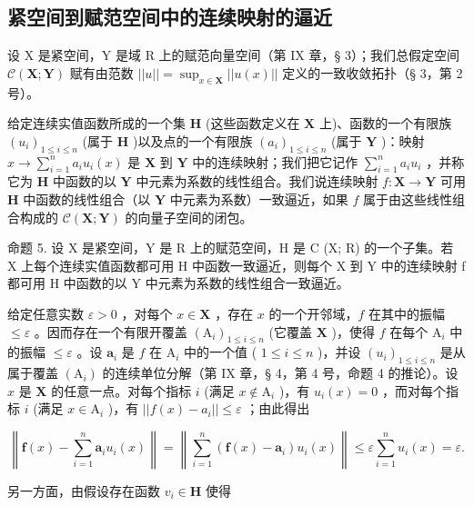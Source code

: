 \subsection{紧空间到赋范空间中的连续映射的逼近}

设 X 是紧空间，Y 是域 R 上的赋范向量空间（第 IX 章，§ 3）；我们总假定空间 \(\mathcal{C}(\mathbf{X};\mathbf{Y})\) 赋有由范数 \(||u|| = \sup_{x\in \mathbf{X}}||u(x)||\) 定义的一致收敛拓扑（§ 3，第 2 号）。

给定连续实值函数所成的一个集 \(\mathbf{H}\) (这些函数定义在 \(\mathbf{X}\) 上)、函数的一个有限族 \((u_i)_{1\leqslant i\leqslant n}\) (属于 \(\mathbf{H}\) )以及点的一个有限族 \((a_i)_{1\leqslant i\leqslant n}\) (属于 \(\mathbf{Y}\) )：映射 \(x\to \sum_{i = 1}^{n}a_iu_i(x)\) 是 \(\mathbf{X}\) 到 \(\mathbf{Y}\) 中的连续映射；我们把它记作 \(\sum_{i = 1}^{n}a_iu_i\) ，并称它为 \(\mathbf{H}\) 中函数的以 \(\mathbf{Y}\) 中元素为系数的线性组合。我们说连续映射 \(f:\mathbf{X}\rightarrow \mathbf{Y}\) 可用 \(\mathbf{H}\) 中函数的线性组合（以 \(\mathbf{Y}\) 中元素为系数）一致逼近，如果 \(f\) 属于由这些线性组合构成的 \(\mathcal{C}(\mathbf{X};\mathbf{Y})\) 的向量子空间的闭包。

命题 5. 设 X 是紧空间，Y 是 R 上的赋范空间，H 是 C (X; R) 的一个子集。若 X 上每个连续实值函数都可用 H 中函数一致逼近，则每个 X 到 Y 中的连续映射 f 都可用 H 中函数的以 Y 中元素为系数的线性组合一致逼近。

给定任意实数 \(\varepsilon > 0\) ，对每个 \(x \in \mathbf{X}\) ，存在 \(x\) 的一个开邻域，\(f\) 在其中的振幅 \(\leqslant \varepsilon\) 。因而存在一个有限开覆盖 \((\mathrm{A}_i)_{1 \leqslant i \leqslant n}\) (它覆盖 \(\mathbf{X}\) )，使得 \(f\) 在每个 \(\mathrm{A}_i\) 中的振幅 \(\leqslant \varepsilon\) 。设 \(\boldsymbol{a}_i\) 是 \(f\) 在 \(\mathrm{A}_i\) 中的一个值 ( \(1 \leqslant i \leqslant n\) )，并设 \((u_i)_{1 \leqslant i \leqslant n}\) 是从属于覆盖 \((\mathrm{A}_i)\) 的连续单位分解（第 IX 章，§ 4，第 4 号，命题 4 的推论）。设 \(x\) 是 \(\mathbf{X}\) 的任意一点。对每个指标 \(i\) (满足 \(x \notin \mathrm{A}_i\) )，有 \(u_i(x) = 0\) ，而对每个指标 \(i\) (满足 \(x \in \mathrm{A}_i\) )，有 \(||f(x) - a_i|| \leqslant \varepsilon\) ；由此得出

\[
\left\| \boldsymbol {f} (x) - \sum_ {i = 1} ^ {n} \boldsymbol {a} _ {i} u _ {i} (x) \right\| = \left\| \sum_ {i = 1} ^ {n} (\boldsymbol {f} (x) - \boldsymbol {a} _ {i}) u _ {i} (x) \right\| \leqslant \varepsilon \sum_ {i = 1} ^ {n} u _ {i} (x) = \varepsilon .
\]

另一方面，由假设存在函数 \(v_{i} \in \mathbf{H}\) 使得

